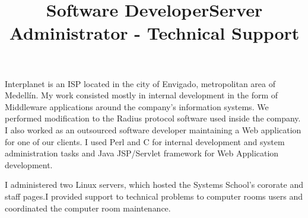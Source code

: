 \begin{resume}
\title{\textbf{Software Developer}}
\begin{position}
Interplanet is an  ISP located in the city of Envigado, metropolitan area of Medell\'{i}n.
My work consisted mostly  in internal development in the form of
Middleware applications  around the company's information systems.
We performed modification to the Radius protocol software used inside the company.
I also worked as an outsourced software developer maintaining a Web
application for one of our clients.  I used Perl and C for internal
development and  system administration tasks and Java JSP/Servlet
framework for Web
Application development.
\end{position}
\newline
\newline
\newline
\newline
\newline
\newline

\title{\textbf{Server Administrator - Technical Support}}
\begin{position}
I administered two Linux servers, which hosted the Systems School's
cororate and staff pages.I provided support to technical problems 
to computer rooms users and coordinated the computer room maintenance.
\end{position}






\end{resume}
